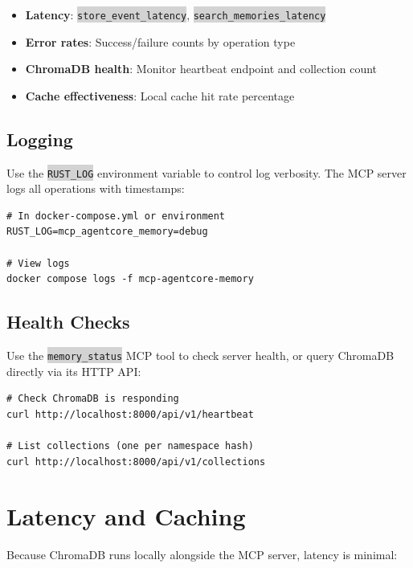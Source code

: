 \documentclass[11pt,letterpaper]{article}
\newcommand{\code}[1]{\texttt{\small\colorbox{lightgray}{#1}}}
\begin{document}
\begin{keybox}
\begin{itemize}
  \item \textbf{Latency}: \code{store\_event\_latency}, \code{search\_memories\_latency}
  \item \textbf{Error rates}: Success/failure counts by operation type
  \item \textbf{ChromaDB health}: Monitor heartbeat endpoint and collection count
  \item \textbf{Cache effectiveness}: Local cache hit rate percentage
\end{itemize}
\end{keybox}

\subsection{Logging}

Use the \code{RUST\_LOG} environment variable to control log verbosity. The MCP server logs all operations with timestamps:

\begin{lstlisting}[caption={Enable debug logging for troubleshooting}, language={}]
# In docker-compose.yml or environment
RUST_LOG=mcp_agentcore_memory=debug

# View logs
docker compose logs -f mcp-agentcore-memory
\end{lstlisting}

\subsection{Health Checks}

Use the \code{memory\_status} MCP tool to check server health, or query ChromaDB directly via its HTTP API:

\begin{lstlisting}[caption={Health check via ChromaDB API}, language={}]
# Check ChromaDB is responding
curl http://localhost:8000/api/v1/heartbeat

# List collections (one per namespace hash)
curl http://localhost:8000/api/v1/collections
\end{lstlisting}

\section{Latency and Caching}

Because ChromaDB runs locally alongside the MCP server, latency is minimal:
\end{document}
